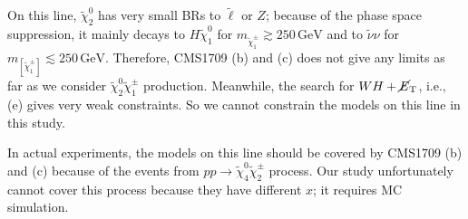 \documentclass[a4paper,10pt,captions=tableheading,DIV=14]{scrartcl}
\numberwithin{equation}{section}
\newcommand\w[1]{_{\mathrm{#1}}}
\newcommand\unit[1]{\,\mathrm{#1}\xspace}
\newcommand\GeV{\unit{GeV}}
\newcommand\neut  [1][\relax]{{\tilde\chi^0_{#1}}}
\newcommand\charPM[1][\relax]{{\tilde\chi^\pm_{#1}}}
\newcommand\mET{\cancel{E}\w T}
\begin{document}
On this line, $\neut[2]$ has very small BRs to $\tilde\ell$ or $Z$; because of the phase space suppression, it mainly decays to $H\neut[1]$ for $m_{\charPM[1]}\gtrsim250\GeV$ and to $\tilde\nu\nu$ for $m_[\charPM[1]]\lesssim250\GeV$.
Therefore, CMS1709 (b) and (c) does not give any limits as far as we consider $\neut[2]\charPM[1]$ production.
Meanwhile, the search for $WH+\mET$, i.e., (e) gives very weak constraints.
So we cannot constrain the models on this line in this study.

In actual experiments, the models on this line should be covered by CMS1709 (b) and (c) because of the events from $pp\to\neut[4]\charPM[2]$ process.
Our study unfortunately cannot cover this process because they have different $x$; it requires MC simulation.







\end{document}
